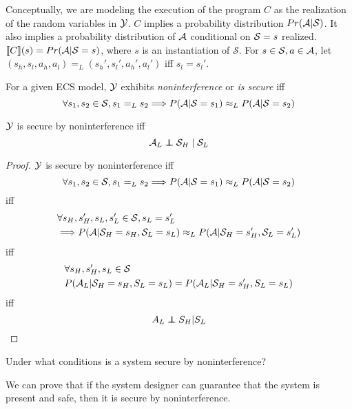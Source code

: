 \documentclass[../thesis.tex]{subfiles}
\begin{document}
Conceptually, we are modeling the execution of the
program $C$ as the realization of the random variables in
$\mathcal{Y}$.
$C$ implies a probability distribution $Pr(\mathcal{A} \vert \mathcal{S})$.
It also implies a probability distribution of $\mathcal{A}$
conditional on $\mathcal{S} = s$ realized.
$\llbracket C\rrbracket(s) = Pr(\mathcal{A} \vert \mathcal{S} = s)$, where $s$ is an instantiation of $\mathcal{S}$.
For $s \in \mathcal{S}, a \in \mathcal{A}$, let
$(s_h,s_l,a_h,a_l) =_L (s_h',s_l',a_h',a_l')$
iff $s_l = s_l'$.

\begin{dfn}
  For a given ECS model, $\mathcal{Y}$
  exhibits \emph{noninterference} or \emph{is secure} iff
 $$\forall s_1,s_2  \in \mathcal{S}, s_1 =_L s_2 \Longrightarrow P(\mathcal{A} \vert \mathcal{S} = s_1) \approx_L P(\mathcal{A} \vert \mathcal{S} = s_2)$$
\end{dfn}

\begin{cor}\label{cor:noninterference-ind}
  $\mathcal{Y}$ is secure by noninterference iff
  $$\A_L \independent \mc{S}_H \given \mc{S}_L$$
\end{cor}
\begin{proof}
  $\mathcal{Y}$ is secure by noninterference iff
  $$\forall s_1,s_2  \in \mathcal{S}, s_1 =_L s_2 \Longrightarrow P(\mathcal{A} \vert \mathcal{S} = s_1) \approx_L P(\mathcal{A} \vert \mathcal{S} = s_2)$$
  iff
  \begin{equation}
    \begin{split}
      & \forall s_H,s_H',s_L,s_L'  \in \mathcal{S}, s_L = s_L' \\
      & \Longrightarrow P(\mathcal{A} \vert \mathcal{S}_H = s_H, \mathcal{S}_L = s_L) \approx_L P(\mathcal{A} \vert \mathcal{S}_H = s_H', \mathcal{S}_L = s_L')
    \end{split}
  \end{equation}
  iff
  \begin{equation}
    \begin{split}
      & \forall s_H,s_H',s_L \in \mathcal{S} \\
      & P(\mathcal{A}_L \vert \mathcal{S}_H = s_H, S_L = s_L) = P(\mathcal{A}_L \vert \mathcal{S}_H = s_H', S_L = s_L)
    \end{split}
  \end{equation}
  iff
  $$A_L \independent S_H \vert S_L$$
\end{proof}

Under what conditions is a system secure by noninterference?

We can prove that if the system designer can guarantee
that the system is present and safe, then it is secure
by noninterference.
\end{document}
